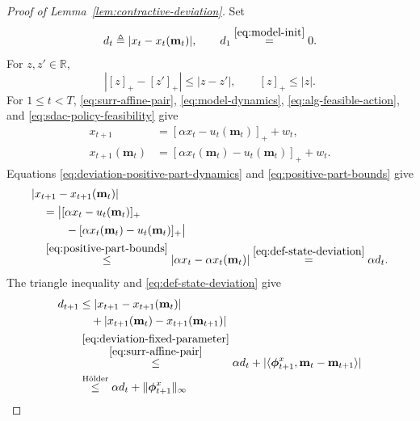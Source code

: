 \documentclass[journal]{IEEEtran}
\theoremstyle{remark}
\begin{document}
\begin{proof}[Proof of Lemma~\ref{lem:contractive-deviation}]
Set
\begin{equation}
\label{eq:def-state-deviation}
d_t\triangleq|x_t-x_t(\mathbf{m}_t)|,\qquad
d_1\overset{\eqref{eq:model-init}}{=}0.
\end{equation}
For $z,z'\in\mathbb{R}$,
\begin{equation}
\label{eq:positive-part-bounds}
|[z]_+-[z']_+|\le|z-z'|,\qquad [z]_+\le|z|.
\end{equation}
For $1\le t<T$, \eqref{eq:surr-affine-pair}, \eqref{eq:model-dynamics},
\eqref{eq:alg-feasible-action}, and \eqref{eq:sdac-policy-feasibility}
give
\begin{equation}
\label{eq:deviation-positive-part-dynamics}
\begin{aligned}
x_{t+1}
&=[\alpha x_t-u_t(\mathbf{m}_t)]_++w_t,\\
x_{t+1}(\mathbf{m}_t)
&=[\alpha x_t(\mathbf{m}_t)-u_t(\mathbf{m}_t)]_++w_t.
\end{aligned}
\end{equation}
Equations \eqref{eq:deviation-positive-part-dynamics} and
\eqref{eq:positive-part-bounds} give
\begin{equation}
\label{eq:deviation-fixed-parameter}
\begin{aligned}
&|x_{t+1}-x_{t+1}(\mathbf{m}_t)|\\
&\quad=\bigl|[\alpha x_t-u_t(\mathbf{m}_t)]_+\\
&\qquad\quad-[\alpha x_t(\mathbf{m}_t)-u_t(\mathbf{m}_t)]_+\bigr|\\
&\quad\overset{\eqref{eq:positive-part-bounds}}{\le}
|\alpha x_t-\alpha x_t(\mathbf{m}_t)|
\overset{\eqref{eq:def-state-deviation}}{=}\alpha d_t.
\end{aligned}
\end{equation}
The triangle inequality and \eqref{eq:def-state-deviation} give
\begin{equation}
\label{eq:deviation-recursion}
\begin{aligned}
d_{t+1}
&\le|x_{t+1}-x_{t+1}(\mathbf{m}_t)|\\
&\quad+|x_{t+1}(\mathbf{m}_t)-x_{t+1}(\mathbf{m}_{t+1})|\\
&\overset{\substack{\eqref{eq:deviation-fixed-parameter}\\
\eqref{eq:surr-affine-pair}}}{\le}\alpha d_t+
|\langle\boldsymbol{\phi}_{t+1}^x,
\mathbf{m}_t-\mathbf{m}_{t+1}\rangle|\\
&\overset{\text{H\"older}}{\le}\alpha d_t+
\|\boldsymbol{\phi}_{t+1}^x\|_\infty

\end{aligned}
\end{equation}
\end{proof}
\end{document}
